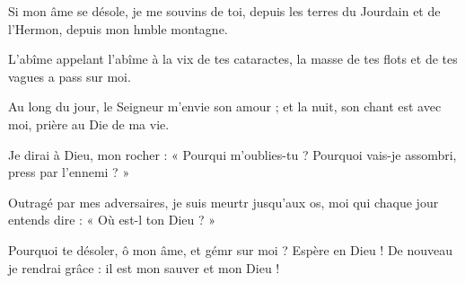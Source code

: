 \item Si mon âme se désole, je me souvins de toi,\psstar{} depuis les terres du Jourdain et de l’Hermon, depuis mon hmble montagne.
\item L’abîme appelant l’abîme à la vix de tes cataractes,\psstar{} la masse de tes flots et de tes vagues a pass sur moi.
\item Au long du jour, le Seigneur m’envie son amour ;\psstar{} et la nuit, son chant est avec moi, prière au Die de ma vie.
\item Je dirai à Dieu, mon rocher : « Pourqui m’oublies-tu ?\psstar{} Pourquoi vais-je assombri, press par l’ennemi ? »
\item Outragé par mes adversaires, je suis meurtr jusqu’aux os,\psstar{} moi qui chaque jour entends dire : « Où est-l ton Dieu ? »
\item Pourquoi te désoler, ô mon âme, et gémr sur moi ?\psstar{} Espère en Dieu ! De nouveau je rendrai grâce : il est mon sauver et mon Dieu !